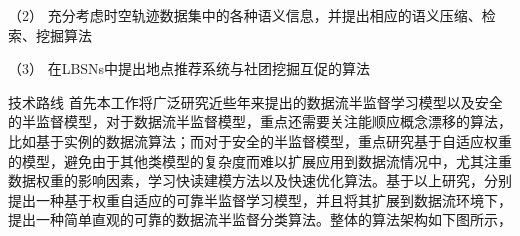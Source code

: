 （2） 充分考虑时空轨迹数据集中的各种语义信息，并提出相应的语义压缩、检索、挖掘算法

（3） 在LBSNs中提出地点推荐系统与社团挖掘互促的算法

技术路线
首先本工作将广泛研究近些年来提出的数据流半监督学习模型以及安全的半监督模型，对于数据流半监督模型，重点还需要关注能顺应概念漂移的算法，比如基于实例的数据流算法；而对于安全的半监督模型，重点研究基于自适应权重的模型，避免由于其他类模型的复杂度而难以扩展应用到数据流情况中，尤其注重数据权重的影响因素，学习快读建模方法以及快速优化算法。基于以上研究，分别提出一种基于权重自适应的可靠半监督学习模型，并且将其扩展到数据流环境下，提出一种简单直观的可靠的数据流半监督分类算法。整体的算法架构如下图所示，



%







